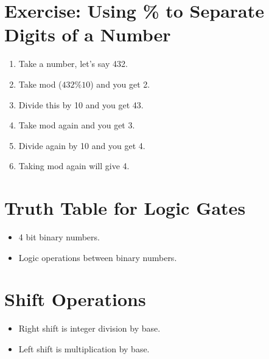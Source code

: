 \documentclass[12pt,a4paper]{article}
\begin{document}
\section{Exercise: Using \% to Separate Digits of a Number}
\begin{enumerate}
\item Take a number, let's say 432.
\item Take mod ($432 \% 10$) and you get 2.
\item Divide this by 10 and you get 43.
\item Take mod again and you get 3.
\item Divide again by 10 and you get 4.
\item Taking mod again will give 4.
\end{enumerate}
\section{Truth Table for Logic Gates}
\begin{itemize}
\item 4 bit binary numbers.
\item Logic operations between binary numbers.
\end{itemize}
\section{Shift Operations}
\begin{itemize}
\item Right shift is integer division by base.
\item Left shift is multiplication by base.
\end{itemize}
\end{document}
